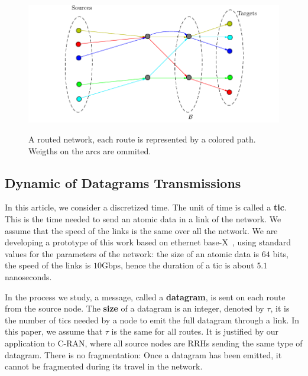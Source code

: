 \documentclass[a4paper,10pt]{journal}
\begin{document}
\begin{figure}
\centering

	
	\includegraphics[scale=0.7]{graphmodel}\\

\caption{A routed network, each route is represented by a colored path. Weigths on the arcs are ommited.}
\label{fig:graphmodel}
\end{figure} 
 

	 
	 
 	\subsection{Dynamic of Datagrams Transmissions}
	    
 		In this article, we consider a discretized time. The unit of time is called a {\bf tic}. This is the time needed to send an atomic data in a link of the network. We assume that the speed of the links is the same over all the network. We are developing a prototype of this work based on ethernet base-X~\cite{ieee_8023}, using standard values for the parameters of the network: the size of an atomic data is $64$ bits, the speed of the links is $10$Gbps, hence the duration of a tic is about $5.1$ nanoseconds. 

        In the process we study, a message, called a {\bf datagram}, is sent on each route from the source node. The \textbf{size} of a datagram is an integer, denoted by $\tau$, it is the number of tics needed by a node to emit the full datagram through a link.  In this paper, we assume that $\tau$ is the same for all routes. It is justified by our application to C-RAN, where all source nodes are RRHs sending the same type of datagram. There is no fragmentation: Once a datagram has been emitted, it cannot be fragmented during its travel in the network. 
\end{document}
